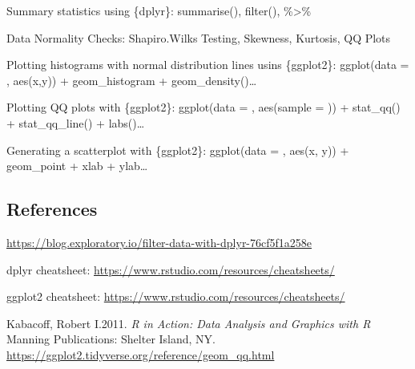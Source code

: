\documentclass[]{article}
\begin{document}
Summary statistics using \{dplyr\}: summarise(), filter(),
\%\textgreater{}\%

Data Normality Checks: Shapiro.Wilks Testing, Skewness, Kurtosis, QQ
Plots

Plotting histograms with normal distribution lines usins \{ggplot2\}:
ggplot(data = , aes(x,y)) + geom\_histogram + geom\_density()\ldots{}

Plotting QQ plots with \{ggplot2\}: ggplot(data = , aes(sample = )) +
stat\_qq() + stat\_qq\_line() + labs()\ldots{}

Generating a scatterplot with \{ggplot2\}: ggplot(data = , aes(x, y)) +
geom\_point + xlab + ylab\ldots{}

\subsection{References}\label{references}

\url{https://blog.exploratory.io/filter-data-with-dplyr-76cf5f1a258e}

dplyr cheatsheet: \url{https://www.rstudio.com/resources/cheatsheets/}

ggplot2 cheatsheet: \url{https://www.rstudio.com/resources/cheatsheets/}

Kabacoff, Robert I.2011. \emph{R in Action: Data Analysis and Graphics
with R} Manning Publications: Shelter Island, NY.\\
\url{https://ggplot2.tidyverse.org/reference/geom_qq.html}
\end{document}
